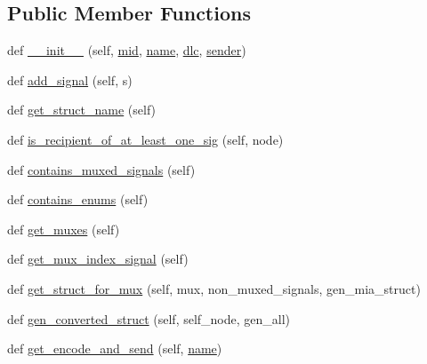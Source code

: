 \subsection*{Public Member Functions}
\begin{DoxyCompactItemize}
\item 
def \hyperlink{classdbc__parse_1_1Message_a5727366fcc84fa040387bfb944451e0f}{\+\_\+\+\_\+init\+\_\+\+\_\+} (self, \hyperlink{classdbc__parse_1_1Message_a1471af7a123cef3cdea575dccbaaa8ec}{mid}, \hyperlink{classdbc__parse_1_1Message_a740b3f2db8f50f6254f2dfbb75f39148}{name}, \hyperlink{classdbc__parse_1_1Message_ac0dfe459d45cc2c985fb00006d07129a}{dlc}, \hyperlink{classdbc__parse_1_1Message_a3d03a385559ab7062fc87b17b6b9becb}{sender})
\item 
def \hyperlink{classdbc__parse_1_1Message_a0b020e3f83316505ebb9d19e13a4323d}{add\+\_\+signal} (self, s)
\item 
def \hyperlink{classdbc__parse_1_1Message_a5fa2e8413aec9063fa70fa2664a5d6c4}{get\+\_\+struct\+\_\+name} (self)
\item 
def \hyperlink{classdbc__parse_1_1Message_a57de3254a55998110867d560f1c20b15}{is\+\_\+recipient\+\_\+of\+\_\+at\+\_\+least\+\_\+one\+\_\+sig} (self, node)
\item 
def \hyperlink{classdbc__parse_1_1Message_aa52a796f8118c11d304f85b17d3e125c}{contains\+\_\+muxed\+\_\+signals} (self)
\item 
def \hyperlink{classdbc__parse_1_1Message_a305483ca621d50539e5f6242b205930b}{contains\+\_\+enums} (self)
\item 
def \hyperlink{classdbc__parse_1_1Message_af047a7de502e95b6d978cb655aa2cd23}{get\+\_\+muxes} (self)
\item 
def \hyperlink{classdbc__parse_1_1Message_abd1b4cd98e88de6dcd793e28618f2475}{get\+\_\+mux\+\_\+index\+\_\+signal} (self)
\item 
def \hyperlink{classdbc__parse_1_1Message_acbd7b56360eb697ef7d7f4f02bba8257}{get\+\_\+struct\+\_\+for\+\_\+mux} (self, mux, non\+\_\+muxed\+\_\+signals, gen\+\_\+mia\+\_\+struct)
\item 
def \hyperlink{classdbc__parse_1_1Message_a85b8236d15e5438609c83375916f3c50}{gen\+\_\+converted\+\_\+struct} (self, self\+\_\+node, gen\+\_\+all)
\item 
def \hyperlink{classdbc__parse_1_1Message_af0370b4150f9a45849f7e01deddb18a3}{get\+\_\+encode\+\_\+and\+\_\+send} (self, \hyperlink{classdbc__parse_1_1Message_a740b3f2db8f50f6254f2dfbb75f39148}{name})
\item 

\end{DoxyCompactItemize}
